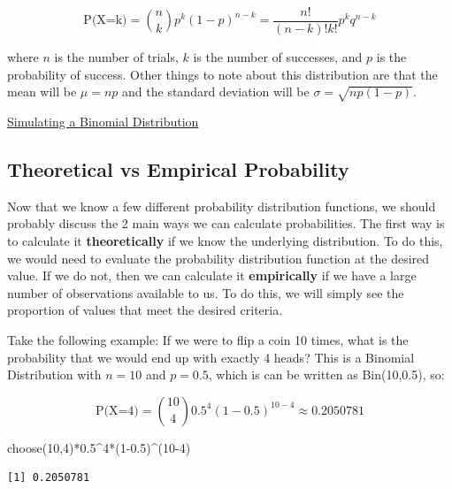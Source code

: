 \documentclass[
  letterpaper,
  DIV=11,
  numbers=noendperiod]{scrreprt}
\newenvironment{Shaded}{\begin{snugshade}}{\end{snugshade}}
\newcommand{\DecValTok}[1]{\textcolor[rgb]{0.68,0.00,0.00}{#1}}
\newcommand{\FloatTok}[1]{\textcolor[rgb]{0.68,0.00,0.00}{#1}}
\newcommand{\FunctionTok}[1]{\textcolor[rgb]{0.28,0.35,0.67}{#1}}
\newcommand{\NormalTok}[1]{\textcolor[rgb]{0.00,0.23,0.31}{#1}}
\newcommand{\SpecialCharTok}[1]{\textcolor[rgb]{0.37,0.37,0.37}{#1}}
\begin{document}
\[ \text{P(X=k)}={n\choose k}p^k(1-p)^{n-k}=\frac{n!}{(n-k)!k!}p^kq^{n-k}\]

where \(n\) is the number of trials, \(k\) is the number of successes,
and \(p\) is the probability of success. Other things to note about this
distribution are that the mean will be \(\mu=np\) and the standard
deviation will be \(\sigma=\sqrt{np(1-p)}\).

\begin{watch}{}{}
    \href{https://youtu.be/RObY6UvS6fs}{Simulating a Binomial Distribution}
\end{watch}

\subsection{Theoretical vs Empirical
Probability}\label{theoretical-vs-empirical-probability}

Now that we know a few different probability distribution functions, we
should probably discuss the 2 main ways we can calculate probabilities.
The first way is to calculate it \textbf{theoretically} if we know the
underlying distribution. To do this, we would need to evaluate the
probability distribution function at the desired value. If we do not,
then we can calculate it \textbf{empirically} if we have a large number
of observations available to us. To do this, we will simply see the
proportion of values that meet the desired criteria.

Take the following example: If we were to flip a coin 10 times, what is
the probability that we would end up with exactly 4 heads? This is a
Binomial Distribution with \(n=10\) and \(p=0.5\), which is can be
written as Bin(10,0.5), so:

\[ \text{P(X=4)}={10\choose 4}0.5^4(1-0.5)^{10-4}\approx 0.2050781 \]

\begin{Shaded}
\begin{Highlighting}[]
\FunctionTok{choose}\NormalTok{(}\DecValTok{10}\NormalTok{,}\DecValTok{4}\NormalTok{)}\SpecialCharTok{*}\FloatTok{0.5}\SpecialCharTok{\^{}}\DecValTok{4}\SpecialCharTok{*}\NormalTok{(}\DecValTok{1}\FloatTok{{-}0.5}\NormalTok{)}\SpecialCharTok{\^{}}\NormalTok{(}\DecValTok{10{-}4}\NormalTok{)}
\end{Highlighting}
\end{Shaded}

\begin{verbatim}
[1] 0.2050781
\end{verbatim}
\end{document}
